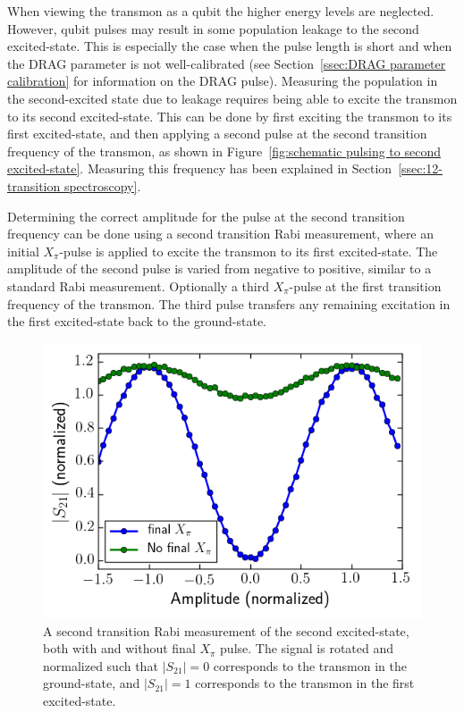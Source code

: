         When viewing the transmon as a qubit the higher energy levels are neglected. However, qubit pulses may result in some population leakage to the second excited-state. This is especially the case when the pulse length is short and when the DRAG parameter is not well-calibrated (see Section~\ref{ssec:DRAG parameter calibration} for information on the DRAG pulse). Measuring the population in the second-excited state due to leakage requires being able to excite the transmon to its second excited-state. This can be done by first exciting the transmon to its first excited-state, and then applying a second pulse at the second transition frequency of the transmon, as shown in Figure~\ref{fig:schematic pulsing to second excited-state}. Measuring this frequency has been explained in Section~\ref{ssec:12-transition spectroscopy}.

        Determining the correct amplitude for the pulse at the second transition frequency can be done using a second transition Rabi measurement, where an initial $X_\pi$-pulse is applied to excite the transmon to its first excited-state. The amplitude of the second pulse is varied from negative to positive, similar to a standard Rabi measurement. Optionally a third $X_\pi$-pulse at the first transition frequency of the transmon. The third pulse transfers any remaining excitation in the first excited-state back to the ground-state.

        \begin{figure}
          \begin{center}
          \vspace{-30pt}
            \includegraphics[width=\textwidth]{../Figures/Qubit characterization/Rabi12.png}
          \end{center}
          \vspace{-20 pt}
          \caption{A second transition Rabi measurement of the second excited-state, both with and without final $X_\pi$ pulse. The signal is rotated and normalized such that $\left|S_{21}\right|=0$ corresponds to the transmon in the ground-state, and $\left|S_{21}\right|=1$ corresponds to the transmon in the first excited-state.}
          \label{fig:Rabi12}
        \end{figure}

